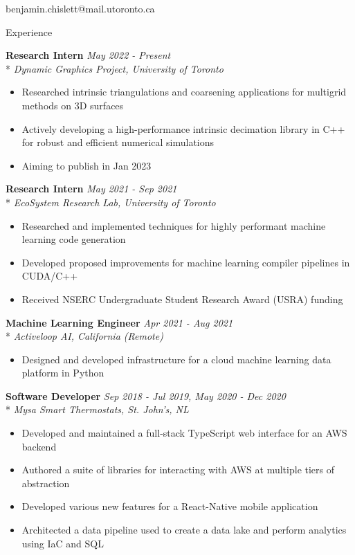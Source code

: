 \documentclass[11pt, letterpaper]{article}
\title{}
\author{Benjamin Chislett}
\date{}
\begin{document}
\begin{center}
  \Huge\theauthor
  \par
  \vspace{1mm}
  \large{benjamin.chislett@mail.utoronto.ca}
  \par
\end{center}

\begin{section}{Experience}

\textbf{Research Intern}
\hfill
\textit{May 2022 - Present}\\*
\textit{Dynamic Graphics Project, University of Toronto}
\begin{itemize}
  \item Researched intrinsic triangulations and coarsening applications for multigrid methods on 3D surfaces
  \item Actively developing a high-performance intrinsic decimation library in C++ for robust and efficient numerical simulations
  \item Aiming to publish in Jan 2023 \\
\end{itemize}

\textbf{Research Intern}
\hfill
\textit{May 2021 - Sep 2021}\\*
\textit{EcoSystem Research Lab, University of Toronto}
\begin{itemize}
  \item Researched and implemented techniques for highly performant machine learning code generation
  \item Developed proposed improvements for machine learning compiler pipelines in CUDA/C++
  \item Received NSERC Undergraduate Student Research Award (USRA) funding \\
\end{itemize}

\textbf{Machine Learning Engineer}
\hfill
\textit{Apr 2021 - Aug 2021}\\*
\textit{Activeloop AI, California (Remote)}
\begin{itemize}
  \item Designed and developed infrastructure for a cloud machine learning data platform in Python \\
\end{itemize}

\textbf{Software Developer}
\hfill
\textit{Sep 2018 - Jul 2019, May 2020 - Dec 2020}\\*
\textit{Mysa Smart Thermostats, St. John's, NL}
\begin{itemize}
  \item Developed and maintained a full-stack TypeScript web interface for an AWS backend
  \item Authored a suite of libraries for interacting with AWS at multiple tiers of abstraction
  \item Developed various new features for a React-Native mobile application
  \item Architected a data pipeline used to create a data lake and perform analytics using IaC and SQL \\
\end{itemize}


\end{section}
\end{document}
